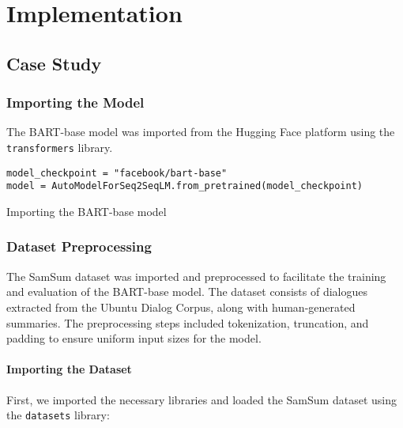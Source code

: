 \chapter{Implementation}
\section{Case Study}

    \subsection{Importing the Model}
        The BART-base model was imported from the Hugging Face platform using the \texttt{transformers} library.
        \begin{listing}[H]
            \begin{verbatim}
model_checkpoint = "facebook/bart-base"
model = AutoModelForSeq2SeqLM.from_pretrained(model_checkpoint)
            \end{verbatim}
            \caption{Importing the BART-base model}
            \label{listing:Importing_BART}
        \end{listing}
    
        \subsection{Dataset Preprocessing}

The SamSum dataset was imported and preprocessed to facilitate the training and evaluation of the BART-base model. The dataset consists of dialogues extracted from the Ubuntu Dialog Corpus, along with human-generated summaries. The preprocessing steps included tokenization, truncation, and padding to ensure uniform input sizes for the model.

\subsubsection{Importing the Dataset}

First, we imported the necessary libraries and loaded the SamSum dataset using the \texttt{datasets} library:

